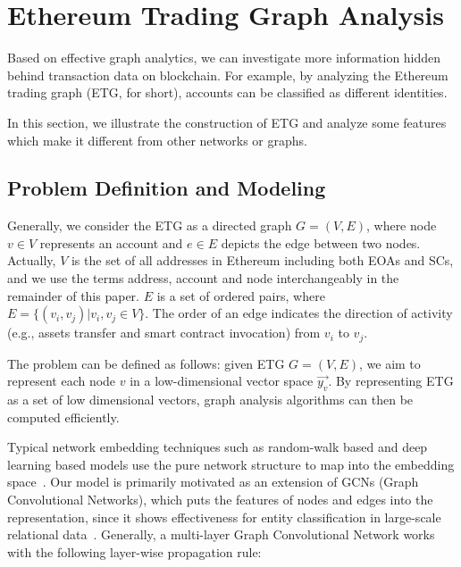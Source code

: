 
\section{Ethereum Trading Graph Analysis}
Based on effective graph analytics, we can investigate more information hidden behind transaction data on blockchain. For example, by analyzing the Ethereum trading graph (ETG, for short), accounts can be classified as different identities. 

In this section, we illustrate the construction of ETG and analyze some features which make it different from other networks or graphs.



\subsection{Problem Definition and Modeling}
Generally, we consider the ETG as a directed graph $G=(V,E)$, where node $v \in V$ represents an account and $e \in E$ depicts the edge between two nodes. Actually, $V$ is the set of all addresses in Ethereum including both EOAs and SCs, and we use the terms address, account and node interchangeably in the remainder of this paper. $E$ is a set of ordered pairs, where $E=\{(v_i,v_j)|v_i,v_j \in V\}$. The order of an edge indicates the direction of activity (e.g., assets transfer and smart contract invocation) from $v_i$ to $v_j$.

The problem can be defined as follows: given ETG $G=(V,E)$, we aim to represent each node $v$ in a low-dimensional vector space $\vec{y_v}$. By representing ETG as a set of low dimensional vectors, graph analysis algorithms can then be computed efficiently. 

Typical network embedding techniques such as random-walk based and deep learning based models use the pure network structure to map into the embedding space~\cite{goyal2018capturing}. Our model is primarily motivated as an extension of GCNs (Graph Convolutional Networks), which puts the features of nodes and edges into the representation, since it shows effectiveness for entity classification in large-scale relational data~\cite{kipf2016semi}. Generally, a multi-layer Graph Convolutional Network works with the following layer-wise propagation rule:

